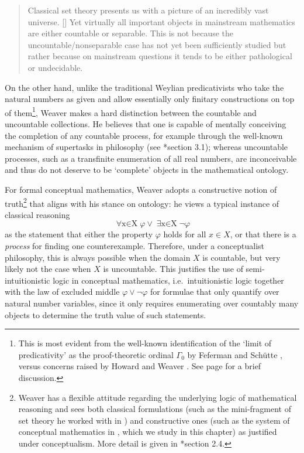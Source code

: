 \documentclass[12pt,openany]{book}
\theoremstyle{plain}
\theoremstyle{definition}
\newcommand\opA[1]{\mathop{\forall #1}}
\newcommand\opE[1]{\mathop{\exists #1}}
\begin{document}
\begin{quote}
  Classical set theory presents us with a picture of an incredibly vast universe. [\textellipsis] Yet virtually all important objects in mainstream mathematics are either countable or separable. This is not because the uncountable/nonseparable case has not yet been sufficiently studied but rather because on mainstream questions it tends to be either pathological or undecidable.
\end{quote}

On the other hand, unlike the traditional Weylian predicativists who take the natural numbers as given and allow essentially only finitary constructions on top of them\footnote{This is most evident from the well-known identification of the `limit of predicativity' as the proof-theoretic ordinal $\Gamma_0$ by Feferman \cite{feferman64-predicative-analysis} and Sch\"utte \cite{schutte65-predicative-well-orderings}, versus concerns raised by Howard \cite{howard96-proof-theory} and Weaver \cites{weaver09-predicativity,weaver18-predicative-well-ordering}. See page \pageref{loc:lim-pred-discuss} for a brief discussion.}, Weaver makes a hard distinction between the countable and uncountable collections. He believes that one is capable of mentally conceiving the completion of any countable process, for example through the well-known mechanism of supertasks in philosophy (see \cite{weaver09-set}*{section 3.1}); whereas uncountable processes, such as a transfinite enumeration of all real numbers, are inconceivable and thus do not deserve to be `complete' objects in the mathematical ontology.

For formal conceptual mathematics, Weaver adopts a constructive notion of truth\footnote{Weaver has a flexible attitude regarding the underlying logic of mathematical reasoning and sees both classical formulations (such as the mini-fragment of set theory he worked with in \cite{weaver05-j2}) and constructive ones (such as the system of conceptual mathematics in \cite{weaver09-cm}, which we study in this chapter) as justified under conceptualism. More detail is given in \cite{weaver09-set}*{section 2.4}.} that aligns with his stance on ontology: he views a typical instance of classical reasoning
\[\opA{x \in X} \varphi \lor \opE{x \in X} \neg \varphi\]
as the statement that either the property $\varphi$ holds for all $x \in X$, or that there is a \emph{process} for finding one counterexample. Therefore, under a conceptualist philosophy, this is always possible when the domain $X$ is countable, but very likely not the case when $X$ is uncountable. This justifies the use of semi-intuitionistic logic in conceptual mathematics, i.e.\ intuitionistic logic together with the law of excluded middle $\varphi \lor \neg \varphi$ for formulae that only quantify over natural number variables, since it only requires enumerating over countably many objects to determine the truth value of such statements.
\end{document}
